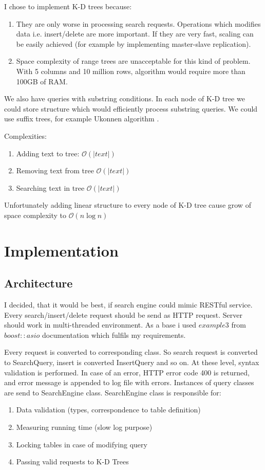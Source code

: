 \documentclass[10pt,a4paper]{article}
\newcommand{\Oh}{\mathcal{O}}
\begin{document}
\bigskip

I chose to implement K-D trees because:
\begin{enumerate}
\item They are only worse in processing search requests. Operations which modifies data i.e. insert/delete are more important. If they are very fast, scaling can be easily achieved (for example by implementing master-slave replication).
\item Space complexity of range trees are unacceptable for this kind of problem. With 5 columns and 10 million rows, algorithm would require more than 100GB of RAM.
\end{enumerate}

\bigskip
We also have queries with substring conditions. In each node of K-D tree we could store structure which would efficiently process substring queries. We could use suffix trees, for example Ukonnen algorithm \cite{STUKK} .

Complexities:
\begin{enumerate}
\item Adding text to tree: $\Oh(|text|)$
\item Removing text from tree $\Oh(|text|)$
\item Searching text in tree $\Oh(|text|)$
\end{enumerate}

Unfortunately adding linear structure to every node of K-D tree cause grow of space complexity to $\Oh(n \log n)$

\section{Implementation}

\subsection{Architecture}
I decided, that it would be best, if search engine could mimic RESTful service. Every search/insert/delete request should be send as HTTP request. Server should work in multi-threaded
environment. As a base i used $example3$ \cite{ASIOHTTP} from $boost::asio$ documentation which fulfils my
requirements.

Every request is converted to corresponding class. So search request is converted to SearchQuery,
insert is converted InsertQuery and so on. At these level, syntax validation is performed. In case of an
error, HTTP error code 400 is returned, and error message is appended to log file with errors.
Instances of query classes are send to SearchEngine class. SearchEngine class is responsible for:
\begin{enumerate}
\item Data validation (types, correspondence to table definition)
\item Measuring running time (slow log purpose)
\item Locking tables in case of modifying query
\item Passing valid requests to K-D Trees
\end{enumerate}
\end{document}
